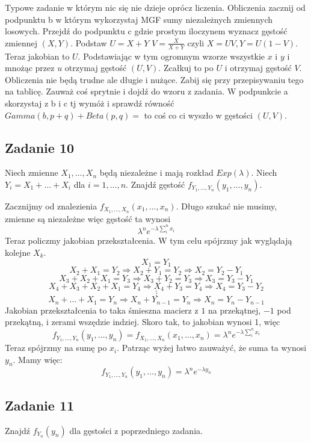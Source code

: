 \documentclass[a4paper]{article}
\begin{document}
Typowe zadanie w którym nic się nie dzieje oprócz liczenia. Obliczenia zacznij od podpunktu b w którym wykorzystaj MGF sumy niezależnych zmiennych losowych. Przejdź do podpunktu c gdzie prostym iloczynem wyznacz gęstość zmiennej $(X,Y)$. Podstaw $U=X+Y$ $V=\frac{X}{X+Y}$ czyli $ X = UV, Y = U(1-V)$. Teraz jakobian to $U$. Podstawiając w tym ogromnym wzorze wszystkie $x$ i $y$ i mnożąc przez $u$ otrzymaj gęstość $(U,V)$. Zcałkuj to po $U$ i otrzymaj gęstość $V$. Obliczenia nie będą trudne ale długie i nużące. Zabij się przy przepisywaniu tego na tablicę. Zauważ coś sprytnie i dojdź do wzoru z zadania. W podpunkcie a skorzystaj z b i c tj wymóż i sprawdź równość $Gamma(b,p+q)+Beta(p,q)=$ to coś co ci wyszło w gęstości $(U,V)$.

\subsection*{Zadanie 10}
Niech zmienne $X_1,\dots , X_n$ będą niezależne i mają rozkład $Exp(\lambda)$. Niech $Y_i=X_1+\dots+X_i$ dla $i=1,\dots , n$. Znajdź gęstość $f_{Y_1, \dots , Y_n}(y_1, \dots ,y_n)$.

Zacznijmy od znalezienia $f_{X_1, \dots ,X_n}(x_1, \dots , x_n)$. Długo szukać nie musimy, zmienne są niezależne więc gęstość ta wynosi $$\lambda^n e^{-\lambda \sum_i^n x_i}$$
Teraz policzmy jakobian przekształcenia. W tym celu spójrzmy jak wyglądają kolejne $X_k$. 
$$X_1=Y_1$$ 
$$X_2+X_1=Y_2 \Rightarrow X_2+Y_1=Y_2 \Rightarrow X_2=Y_2-Y_1$$ 
$$X_3+X_2+X_1=Y_3 \Rightarrow X_3+Y_2=Y_3 \Rightarrow X_3=Y_3-Y_1$$ 
$$X_4+X_3+X_2+X_1=Y_4 \Rightarrow X_4+Y_3=Y_4 \Rightarrow X_4=Y_3-Y_2$$
$$\vdots $$
$$X_n+\dots +X_1 = Y_n \Rightarrow X_n+Y_{n-1} = Y_n \Rightarrow X_n=Y_n-Y_{n-1}$$
Jakobian przekształcenia to taka śmieszna macierz z $1$ na przekątnej, $-1$ pod przekątną, i zerami wszędzie indziej.
Skoro tak, to jakobian wynosi 1, więc $$f_{Y_1, \dots , Y_n}(y_1, \dots ,y_n)=f_{X_1, \dots ,X_n}(x_1, \dots , x_n) = \lambda^n e^{-\lambda \sum_i^n x_i}$$
Teraz spójrzmy na sumę po $x_i$. Patrząc wyżej łatwo zauważyć, że suma ta wynosi $y_n$. Mamy więc:
$$f_{Y_1, \dots , Y_n}(y_1, \dots ,y_n) = \lambda^n e^{-\lambda y_n} $$
\subsection*{Zadanie 11}
Znajdź $f_{Y_n}(y_n)$ dla gęstości z poprzedniego zadania.
\end{document}
